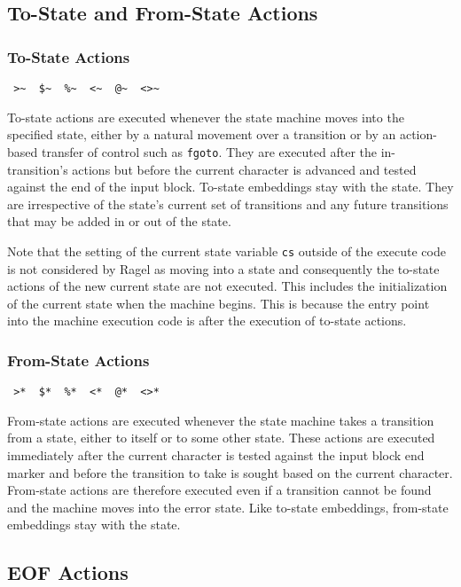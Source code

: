 \documentclass[letterpaper,11pt,oneside]{book}
\newcommand{\verbspace}{\vspace{10pt}}
\begin{document}
\subsection{To-State and From-State Actions}

\subsubsection{To-State Actions}

\verb| >~  $~  %~  <~  @~  <>~ |
\verbspace

To-state actions are executed whenever the state machine moves into the
specified state, either by a natural movement over a transition or by an
action-based transfer of control such as \verb|fgoto|. They are executed after the
in-transition's actions but before the current character is advanced and
tested against the end of the input block. To-state embeddings stay with the
state. They are irrespective of the state's current set of transitions and any
future transitions that may be added in or out of the state.

Note that the setting of the current state variable \verb|cs| outside of the
execute code is not considered by Ragel as moving into a state and consequently
the to-state actions of the new current state are not executed. This includes
the initialization of the current state when the machine begins.  This is
because the entry point into the machine execution code is after the execution
of to-state actions.

\subsubsection{From-State Actions}

\verb| >*  $*  %*  <*  @*  <>* |
\verbspace

From-state actions are executed whenever the state machine takes a transition from a
state, either to itself or to some other state. These actions are executed
immediately after the current character is tested against the input block end
marker and before the transition to take is sought based on the current
character. From-state actions are therefore executed even if a transition
cannot be found and the machine moves into the error state.  Like to-state
embeddings, from-state embeddings stay with the state.

\subsection{EOF Actions}
\end{document}
